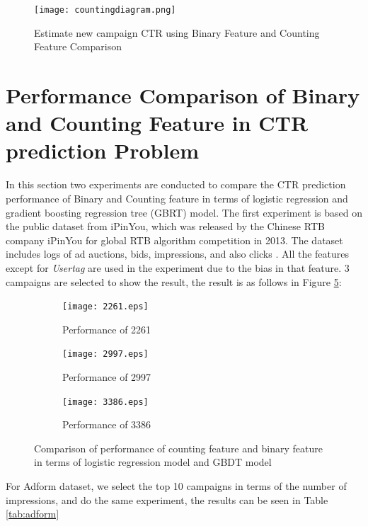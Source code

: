 \begin{figure}[t]
\centering
\texttt{[image: countingdiagram.png]}
\caption{Estimate new campaign CTR using Binary Feature and Counting Feature Comparison}
\label{fig:binary}
\end{figure}

\section{Performance Comparison of Binary and Counting Feature in CTR prediction Problem}

In this section two experiments are conducted to compare the CTR prediction performance of Binary and Counting feature in terms of logistic regression and gradient boosting regression tree (GBRT) model. The first experiment is based on the public dataset from iPinYou, which was released by the Chinese RTB company iPinYou for global RTB algorithm competition in 2013. The dataset includes logs of ad auctions, bids, impressions, and also clicks \cite{zhang2014real}. All the features except for \textit{Usertag} are used in the experiment due to the bias in that feature. 3 campaigns are selected to show the result, the result is as follows in Figure \ref{fig:ipinyou}:
\begin{figure}[h]
    \centering
    \begin{subfigure}[b]{0.3\textwidth}
        \centering
        \texttt{[image: 2261.eps]}
        \caption{Performance of 2261}
        \label{fig:2261}
    \end{subfigure}
    \hfill
    \begin{subfigure}[b]{0.3\textwidth}
        \centering
        \texttt{[image: 2997.eps]}
        \caption{Performance of 2997}
        \label{fig:2997}
    \end{subfigure}
    \hfill
    \begin{subfigure}[b]{0.3\textwidth}
        \centering
        \texttt{[image: 3386.eps]}
        \caption{Performance of 3386}
        \label{fig:3386}
    \end{subfigure}
    \caption{Comparison of performance of counting feature and binary feature in terms of logistic regression model and GBDT model}
    \label{fig:ipinyou}
\end{figure}

For Adform dataset, we select the top 10 campaigns in terms of the number of impressions, and do the same experiment, the results can be seen in Table \ref{tab:adform} 


